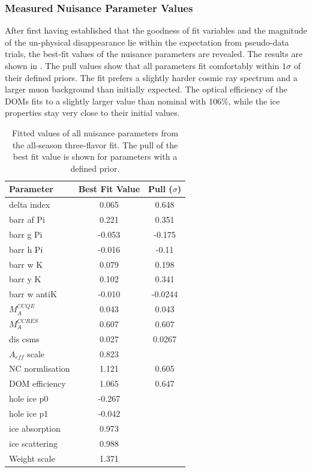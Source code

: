 \subsubsection{Measured Nuisance Parameter Values}
After first having established that the goodness of fit variables and the magnitude of the un-physical disappearance lie within the expectation from pseudo-data trials, the best-fit values of the nuisance parameters are revealed. The results are shown in . The pull values show that all parameters fit comfortably within $1\sigma$ of their defined priors. The fit prefers a slightly harder cosmic ray spectrum and a larger muon background than initially expected. The optical efficiency of the DOMs fits to a slightly larger value than nominal with 106\%, while the ice properties stay very close to their initial values.


\begin{table}
    \centering
    \caption{Fitted values of all nuisance parameters from the all-season three-flavor fit. The pull of the best fit value is shown for parameters with a defined prior.}
    \label{tab:nuisance_params_fittedval}
    \begin{tabular}{lSS} \toprule
        Parameter  & {Best Fit Value} &  {Pull ($\sigma$)} \\ \midrule
        delta index & 0.065 & 0.648 \\
        barr af Pi & 0.221  & 0.351 \\
        barr g Pi & -0.053  & -0.175 \\
        barr h Pi & -0.016  & -0.11 \\
        barr w K & 0.079  & 0.198 \\
        barr y K & 0.102  & 0.341 \\
        barr w antiK & -0.010  & -0.0244 \\
        $M_{A}^{CCQE}$ &  0.043 & 0.043 \\
        $M_{A}^{CCRES}$ & 0.607 & 0.607  \\
        dis csms & 0.027  & 0.0267 \\ 
        $A_{eff}$ scale & 0.823 &  \\
        NC normlisation & 1.121 &  0.605 \\
        DOM efficiency & 1.065  & 0.647 \\
        hole ice p0 & -0.267  &  \\
        hole ice p1 & -0.042  &  \\
        ice absorption & 0.973  &  \\
        ice scattering & 0.988 &  \\ 
        Weight scale & 1.371  &  \\
        \bottomrule
    \end{tabular}
\end{table}

